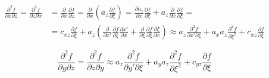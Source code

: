 \begin{equation*}
    \begin{split}
        \frac
            {\partial^2 f}
            {\partial x \partial z}
        =
        \frac
            {\partial^2 f}
            {\partial z \partial x}
        &
        =
        \frac
            {\partial}
            {\partial x}
        \frac
            {\partial f}
            {\partial z}
        =
        \frac
            {\partial}
            {\partial x}
        \left(
            a_z
            \frac
                {\partial f}
                {\partial \xi}
        \right)
        =
        \frac
            {\partial a_z}
            {\partial x}
        \frac
            {\partial f}
            {\partial \xi}
        +
        a_z
        \frac
            {\partial}
            {\partial x}
        \frac
            {\partial f}
            {\partial \xi}
        =
        \\
        &
        =
        c_{xz}
        \frac
            {\partial f}
            {\partial \xi}
        +
        a_z
        \left(
            \frac
                {\partial}
                {\partial x'}
            \frac
                {\partial f}
                {\partial \xi}
            \frac
                {\partial x'}
                {\partial x}
            +
            \frac
                {\partial}
                {\partial \xi}
            \frac
                {\partial f}
                {\partial \xi}
            \frac
                {\partial \xi}
                {\partial x}
        \right)
        \approx
        a_z
        \frac
            {\partial^2 f}
            {\partial x' \partial \xi}
        +
        a_x
        a_z
        \frac
            {\partial^2 f}
            {\partial \xi^2}
        +
        c_{xz}
        \frac
            {\partial f}
            {\partial \xi}
    \end{split}
\end{equation*}

\begin{equation*}
    \frac
        {\partial^2 f}
        {\partial y \partial z}
    =
    \frac
        {\partial^2 f}
        {\partial z \partial y}
    \approx
        a_z
        \frac
            {\partial^2 f}
            {\partial y' \partial \xi}
        +
        a_y
        a_z
        \frac
            {\partial^2 f}
            {\partial \xi^2}
        +
        c_{yz}
        \frac
            {\partial f}
            {\partial \xi}
\end{equation*}